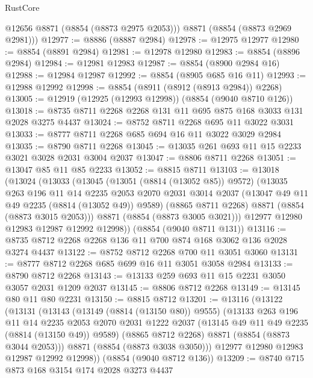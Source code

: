\begin{lexlean}{RustCore}
\begin{coremodule}
        @12656
        @8871
        (@8854 (@8873 @2975 @2053)))
      @8871
      (@8854 (@8873 @2969 @2981)))
@12977 := @8886 (@8887 @2984)
@12978 := @12975 @12977
@12980 := @8854 (@8891 @2984)
@12981 := @12978 @12980
@12983 := @8854 (@8896 @2984)
@12984 := @12981 @12983
@12987 := @8854 (@8900 @2984 @16)
@12988 := @12984 @12987
@12992 := @8854 (@8905 @685 @16 @11)
@12993 := @12988 @12992
@12998 := @8854 (@8911 (@8912 (@8913 @2984)) @2268)
@13005 := @12919 (@12925 (@12993 @12998)) (@8854 (@9040 @8710 @126))
@13018 := @8735 @8711 @2268 @2268 @131 @11 @695 @875 @168 @3033 @131 @2028 @3275 @4437
@13024 := @8752 @8711 @2268 @695 @11 @3022 @3031
@13033 := @8777 @8711 @2268 @685 @694 @16 @11 @3022 @3029 @2984
@13035 := @8790 @8711 @2268
@13045 := @13035 @261 @693 @11 @15 @2233 @3021 @3028 @2031 @3004 @2037
@13047 := @8806 @8711 @2268
@13051 := @13047 @85 @11 @85 @2233
@13052 := @8815 @8711
@13103 := @13018
    (@13024
      (@13033
        (@13045
          (@13051 (@8814 (@13052 @85)) @9572)
          (@13035
            @263
            @196
            @11
            @14
            @2235
            @2053
            @2070
            @2031
            @3014
            @2037
            (@13047 @49 @11 @49 @2235 (@8814 (@13052 @49)) @9589)
            (@8865 @8711 @2268)
            @8871
            (@8854 (@8873 @3015 @2053)))
          @8871
          (@8854 (@8873 @3005 @3021)))
        @12977
        @12980
        @12983
        @12987
        @12992
        @12998))
    (@8854 (@9040 @8711 @131))
@13116 := @8735 @8712 @2268 @2268 @136 @11 @700 @874 @168 @3062 @136 @2028 @3274 @4437
@13122 := @8752 @8712 @2268 @700 @11 @3051 @3060
@13131 := @8777 @8712 @2268 @685 @699 @16 @11 @3051 @3058 @2984
@13133 := @8790 @8712 @2268
@13143 := @13133 @259 @693 @11 @15 @2231 @3050 @3057 @2031 @1209 @2037
@13145 := @8806 @8712 @2268
@13149 := @13145 @80 @11 @80 @2231
@13150 := @8815 @8712
@13201 := @13116
    (@13122
      (@13131
        (@13143
          (@13149 (@8814 (@13150 @80)) @9555)
          (@13133
            @263
            @196
            @11
            @14
            @2235
            @2053
            @2070
            @2031
            @1222
            @2037
            (@13145 @49 @11 @49 @2235 (@8814 (@13150 @49)) @9589)
            (@8865 @8712 @2268)
            @8871
            (@8854 (@8873 @3044 @2053)))
          @8871
          (@8854 (@8873 @3038 @3050)))
        @12977
        @12980
        @12983
        @12987
        @12992
        @12998))
    (@8854 (@9040 @8712 @136))
@13209 := @8740 @715 @873 @168 @3154 @174 @2028 @3273 @4437

\end{coremodule}
\end{lexlean}
